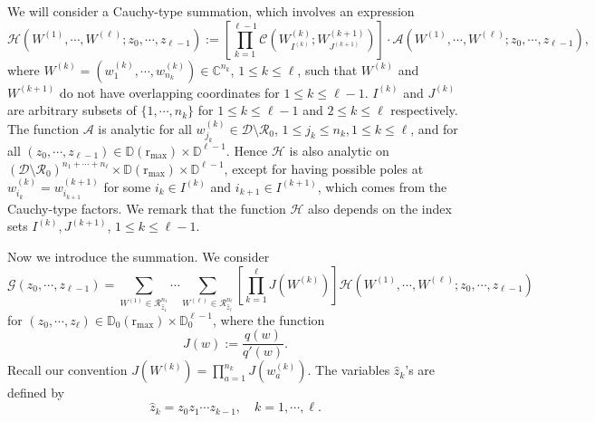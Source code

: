\documentclass{article}
\numberwithin{equation}{section}
\newcommand{\Ch}{\mathcal{C}}
\newcommand{\complexC}{\mathbb{C}}
\newcommand{\rr}{\mathrm{r_{max}}}
\begin{document}
We will consider a Cauchy-type summation, which involves an expression
\begin{equation}
	\label{eq:calH}
	\mathcal{H}\left(W^{(1)},\cdots,W^{(\ell)};z_0,\cdots,z_{\ell-1}\right)
	:= \left[\prod_{k=1}^{\ell-1} \Ch\left( W_{I^{(k)}}^{(k)};  W_{J^{(k+1)}}^{(k+1)}\right)\right] \cdot \mathcal{A}\left(W^{(1)},\cdots,W^{(\ell)};z_0,\cdots,z_{\ell-1}\right),
\end{equation}
where $W^{(k)}=\left(w^{(k)}_1,\cdots,w_{n_k}^{(k)}\right) \in \complexC^{n_k}$, $1\le k\le \ell$, such that $W^{(k)}$ and $W^{(k+1)}$ do not have overlapping coordinates for $1\le k\le \ell-1$. $I^{(k)}$ and $J^{(k)}$ are arbitrary subsets of $ \{1,\cdots,n_k\}$ for $1\le k\le \ell-1$ and $2\le k\le \ell$ respectively. The function $\mathcal{A}$ is analytic for all $w_{j_k}^{(k)}\in\mathcal{D}\setminus\mathcal{R}_0$, $1\le j_k\le n_k, 1\le k\le \ell$, and for all $(z_0,\cdots,z_{\ell-1})\in\mathbb{D}(\rr)\times \mathbb{D}^{\ell-1}$. Hence $\mathcal{H}$ is also analytic on $(\mathcal{D}\setminus \mathcal{R}_0)^{n_1+\cdots+n_\ell}\times \mathbb{D}(\rr)\times \mathbb{D}^{\ell-1}$, except for having possible poles at $w_{i_k}^{(k)}=w_{i_{k+1}}^{(k+1)}$ for some $i_k\in I^{(k)}$ and $i_{k+1}\in I^{(k+1)}$, which comes from the Cauchy-type factors. We remark that the function $\mathcal{H}$ also depends on the index sets $I^{(k)}, J^{(k+1)}$, $1\le k\le \ell-1$.

Now we introduce the summation. We consider
\begin{equation}\label{eq:calG}
	\mathcal{G}(z_0,\cdots,z_{\ell-1})=
	\sum_{W^{(1)}\in \mathcal{R}_{\hat z_1}^{n_1}}
	\cdots
	\sum_{W^{(\ell)}\in \mathcal{R}_{\hat z_\ell}^{n_\ell}}
                \left[\prod_{k=1}^\ell J(W^{(k)})\right]
                \mathcal{H}\left(W^{(1)},\cdots,W^{(\ell)};z_0,\cdots,z_{\ell-1}\right)
\end{equation}
for $(z_0,\cdots,z_\ell) \in \mathbb{D}_0(\rr)\times \mathbb{D}_0^{\ell-1}$,
where the function
\begin{equation}
	J(w):= \frac{q(w)}{q'(w)}.
\end{equation}
Recall our convention $J(W^{(k)})=\prod_{a=1}^{n_k}J(w_a^{(k)})$. The variables $\hat z_k$'s are defined by
\begin{equation}
	\hat z_k = z_0z_1\cdots z_{k-1},\quad k=1,\cdots,\ell.
\end{equation}
\end{document}
